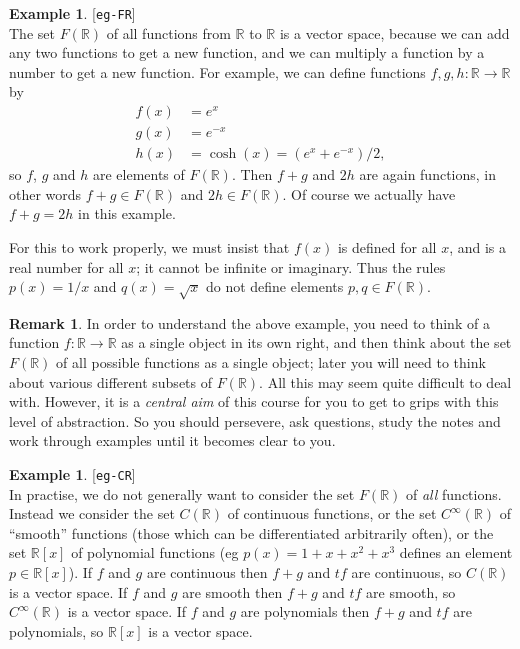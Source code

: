 \documentclass{amsart}
\newcommand{\lbl}[1]{\label{#1}\textup{[\texttt{#1}]}\ \\}
\newcommand{\lbl}{\label}
\newcommand{\R}         {{\mathbb{R}}}
\newcommand{\xra}       {\xrightarrow}
\renewcommand{\:}       {\colon}
\theoremstyle{definition}
\newtheorem{remark}[theorem]{Remark}
\newtheorem{example}[theorem]{Example}
\begin{document}
\begin{example}\lbl{eg-FR}
 The set $F(\R)$ of all functions from $\R$ to $\R$ is a
 vector space, because we can add any two functions to get a
 new function, and we can multiply a function by a number to
 get a new function.  For example, we can define functions
 $f,g,h\:\R\xra{}\R$ by
 \begin{align*}
   f(x) &= e^x \\
   g(x) &= e^{-x} \\
   h(x) &= \cosh(x) = (e^x + e^{-x})/2,
 \end{align*}
 so $f$, $g$ and $h$ are elements of $F(\R)$.  Then $f+g$
 and $2h$ are again functions, in other words $f+g\in F(\R)$
 and $2h\in F(\R)$.  Of course we actually have $f+g=2h$ in
 this example.

 For this to work properly, we must insist that $f(x)$ is
 defined for all $x$, and is a real number for all $x$; it
 cannot be infinite or imaginary.  Thus the rules $p(x)=1/x$
 and $q(x)=\sqrt{x}$ do not define elements $p,q\in F(\R)$.
\end{example}
\begin{remark}
 In order to understand the above example, you need to think
 of a function $f\:\R\to\R$ as a single object in its own
 right, and then think about the set $F(\R)$ of all possible
 functions as a single object; later you will need to think
 about various different subsets of $F(\R)$.  All this may
 seem quite difficult to deal with.  However, it is a
 \emph{central aim} of this course for you to get to grips
 with this level of abstraction.  So you should persevere,
 ask questions, study the notes and work through examples
 until it becomes clear to you.
\end{remark}

\begin{example}\lbl{eg-CR}
 In practise, we do not generally want to consider the set
 $F(\R)$ of \emph{all} functions.  Instead we consider the
 set $C(\R)$ of continuous functions, or the set
 $C^\infty(\R)$ of ``smooth'' functions (those which can be
 differentiated arbitrarily often), or the set $\R[x]$ of
 polynomial functions (eg $p(x)=1+x+x^2+x^3$ defines an
 element $p\in\R[x]$).  If $f$ and $g$ are continuous then
 $f+g$ and $tf$ are continuous, so $C(\R)$ is a vector
 space.  If $f$ and $g$ are smooth then $f+g$ and $tf$ are
 smooth, so $C^\infty(\R)$ is a vector space.  If $f$ and
 $g$ are polynomials then $f+g$ and $tf$ are polynomials, so
 $\R[x]$ is a vector space.
\end{example}
\end{document}
